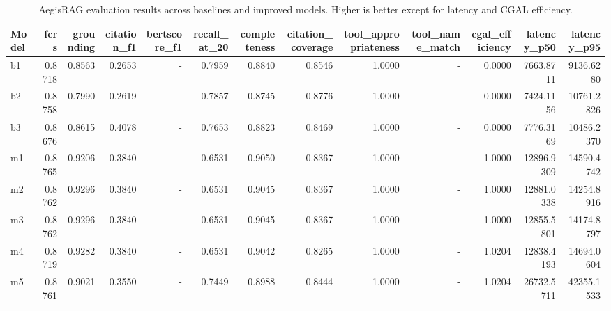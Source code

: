 \begin{table}[t]
\centering
\small
\caption{AegisRAG evaluation results across baselines and improved models. Higher is better except for latency and CGAL efficiency.}
\label{tab:aegis-results}
\begin{tabular}{lrrrrrrrrrrrr}
\toprule
Model & fcrs & grounding & citation\_f1 & bertscore\_f1 & recall\_at\_20 & completeness & citation\_coverage & tool\_appropriateness & tool\_name\_match & cgal\_efficiency & latency\_p50 & latency\_p95 \\
\midrule
b1 & 0.8718 & 0.8563 & 0.2653 & - & 0.7959 & 0.8840 & 0.8546 & 1.0000 & - & 0.0000 & 7663.8711 & 9136.6280 \\
b2 & 0.8758 & 0.7990 & 0.2619 & - & 0.7857 & 0.8745 & 0.8776 & 1.0000 & - & 0.0000 & 7424.1156 & 10761.2826 \\
b3 & 0.8676 & 0.8615 & 0.4078 & - & 0.7653 & 0.8823 & 0.8469 & 1.0000 & - & 0.0000 & 7776.3169 & 10486.2370 \\
m1 & 0.8765 & 0.9206 & 0.3840 & - & 0.6531 & 0.9050 & 0.8367 & 1.0000 & - & 1.0000 & 12896.9309 & 14590.4742 \\
m2 & 0.8762 & 0.9296 & 0.3840 & - & 0.6531 & 0.9045 & 0.8367 & 1.0000 & - & 1.0000 & 12881.0338 & 14254.8916 \\
m3 & 0.8762 & 0.9296 & 0.3840 & - & 0.6531 & 0.9045 & 0.8367 & 1.0000 & - & 1.0000 & 12855.5801 & 14174.8797 \\
m4 & 0.8719 & 0.9282 & 0.3840 & - & 0.6531 & 0.9042 & 0.8265 & 1.0000 & - & 1.0204 & 12838.4193 & 14694.0604 \\
m5 & 0.8761 & 0.9021 & 0.3550 & - & 0.7449 & 0.8988 & 0.8444 & 1.0000 & - & 1.0204 & 26732.5711 & 42355.1533 \\
\bottomrule
\end{tabular}
\end{table}